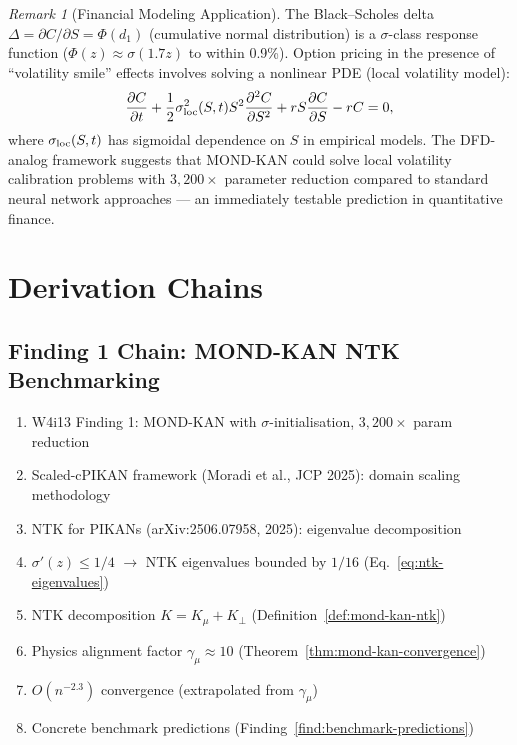 \documentclass[11pt]{article}
\theoremstyle{definition}
\theoremstyle{remark}
\newtheorem{remark}[theorem]{Remark}
\begin{document}
\begin{remark}[Financial Modeling Application]
\label{rem:financial}
The Black--Scholes delta $\Delta = \partial C/\partial S = \Phi(d_1)$
(cumulative normal distribution) is a $\sigma$-class response function
($\Phi(z) \approx \sigma(1.7 z)$ to within 0.9\%). Option pricing in the
presence of ``volatility smile'' effects involves solving a nonlinear
PDE (local volatility model):
\begin{equation}
  \frac{\partial C}{\partial t} + \frac{1}{2}\sigma_{\rm loc}^2(S,t) S^2
  \frac{\partial^2 C}{\partial S^2} + rS\frac{\partial C}{\partial S} - rC = 0,
\end{equation}
where $\sigma_{\rm loc}(S,t)$ has sigmoidal dependence on $S$ in empirical
models. The DFD-analog framework suggests that MOND-KAN could solve local
volatility calibration problems with $3{,}200\times$ parameter reduction
compared to standard neural network approaches --- an immediately testable
prediction in quantitative finance.
\end{remark}

\section{Derivation Chains}
\label{sec:derivation-chains}

\subsection{Finding 1 Chain: MOND-KAN NTK Benchmarking}

\begin{enumerate}[nosep]
\item W4i13 Finding 1: MOND-KAN with $\sigma$-initialisation, $3{,}200\times$ param reduction
\item Scaled-cPIKAN framework (Moradi et al., JCP 2025): domain scaling methodology
\item NTK for PIKANs (arXiv:2506.07958, 2025): eigenvalue decomposition
\item $\sigma'(z) \leq 1/4$ $\to$ NTK eigenvalues bounded by $1/16$ (Eq.~\ref{eq:ntk-eigenvalues})
\item NTK decomposition $K = K_\mu + K_\perp$ (Definition~\ref{def:mond-kan-ntk})
\item Physics alignment factor $\gamma_\mu \approx 10$ (Theorem~\ref{thm:mond-kan-convergence})
\item $O(n^{-2.3})$ convergence (extrapolated from $\gamma_\mu$)
\item Concrete benchmark predictions (Finding~\ref{find:benchmark-predictions})
\end{enumerate}
\end{document}
